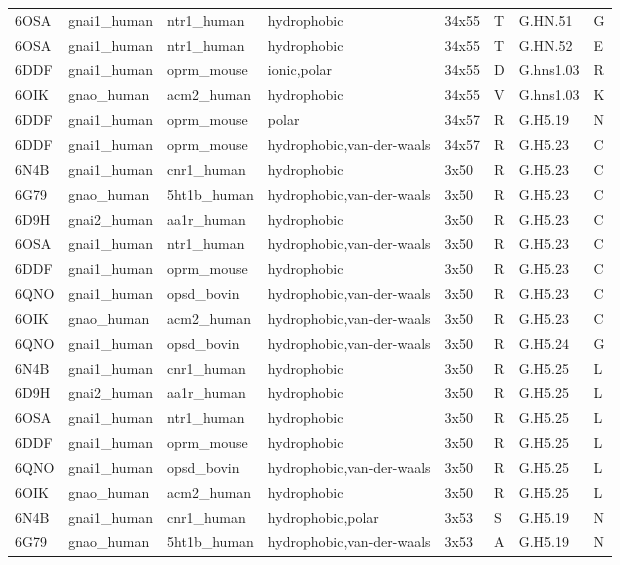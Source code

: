 \begin{landscape}
\begin{longtable}{llllllll}
6OSA & gnai1\_human & ntr1\_human & hydrophobic & 34x55 & T & G.HN.51 & G\\
6OSA & gnai1\_human & ntr1\_human & hydrophobic & 34x55 & T & G.HN.52 & E\\
\addlinespace
6DDF & gnai1\_human & oprm\_mouse & ionic,polar & 34x55 & D & G.hns1.03 & R\\
6OIK & gnao\_human & acm2\_human & hydrophobic & 34x55 & V & G.hns1.03 & K\\
6DDF & gnai1\_human & oprm\_mouse & polar & 34x57 & R & G.H5.19 & N\\
6DDF & gnai1\_human & oprm\_mouse & hydrophobic,van-der-waals & 34x57 & R & G.H5.23 & C\\
6N4B & gnai1\_human & cnr1\_human & hydrophobic & 3x50 & R & G.H5.23 & C\\
\addlinespace
6G79 & gnao\_human & 5ht1b\_human & hydrophobic,van-der-waals & 3x50 & R & G.H5.23 & C\\
6D9H & gnai2\_human & aa1r\_human & hydrophobic & 3x50 & R & G.H5.23 & C\\
6OSA & gnai1\_human & ntr1\_human & hydrophobic,van-der-waals & 3x50 & R & G.H5.23 & C\\
6DDF & gnai1\_human & oprm\_mouse & hydrophobic & 3x50 & R & G.H5.23 & C\\
6QNO & gnai1\_human & opsd\_bovin & hydrophobic,van-der-waals & 3x50 & R & G.H5.23 & C\\
\addlinespace
6OIK & gnao\_human & acm2\_human & hydrophobic,van-der-waals & 3x50 & R & G.H5.23 & C\\
6QNO & gnai1\_human & opsd\_bovin & hydrophobic,van-der-waals & 3x50 & R & G.H5.24 & G\\
6N4B & gnai1\_human & cnr1\_human & hydrophobic & 3x50 & R & G.H5.25 & L\\
6D9H & gnai2\_human & aa1r\_human & hydrophobic & 3x50 & R & G.H5.25 & L\\
6OSA & gnai1\_human & ntr1\_human & hydrophobic & 3x50 & R & G.H5.25 & L\\
\addlinespace
6DDF & gnai1\_human & oprm\_mouse & hydrophobic & 3x50 & R & G.H5.25 & L\\
6QNO & gnai1\_human & opsd\_bovin & hydrophobic,van-der-waals & 3x50 & R & G.H5.25 & L\\
6OIK & gnao\_human & acm2\_human & hydrophobic & 3x50 & R & G.H5.25 & L\\
6N4B & gnai1\_human & cnr1\_human & hydrophobic,polar & 3x53 & S & G.H5.19 & N\\
6G79 & gnao\_human & 5ht1b\_human & hydrophobic,van-der-waals & 3x53 & A & G.H5.19 & N\\

\end{longtable}
\end{landscape}
